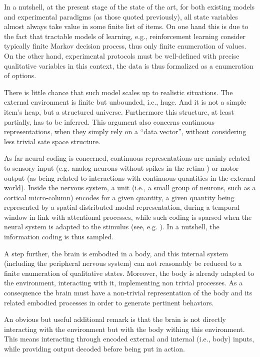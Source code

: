 \documentclass[a4,12pt,twoside]{article}
\begin{document}
In a nutshell, at the present stage of the state of the art, for both existing models and experimental paradigms (as those quoted previously), all state variables almost always take value in some finite list of items. On one hand this is due to the fact that tractable models of learning, e.g., reinforcement learning \cite{sutton1998reinforcement} consider typically finite Markov decision process, thus only finite enumeration of values. On the other hand, experimental protocols must be well-defined with precise qualitative variables in this context, the data is thus formalized as a enumeration of options. 

There is little chance that such model scales up to realistic situations. The external environment is finite but unbounded, i.e., huge. And it is not a simple item’s heap, but a structured universe. Furthermore this structure, at least partially,  has to be inferred. This argument also concerns continuous representations, when they simply rely on a ``data vector'', without considering less trivial sate space structure.

As far neural coding is concerned, continuous representations are mainly related to sensory input (e.g. analog neurons without spikes in the retina \cite{citeulike:7955297}) or motor output (as being related to interactions with continuous quantities in the external world). Inside the nervous system, a unit (i.e., a small group of neurons, such as a cortical micro-column) encodes for a given quantity, a given quantity being represented by a spatial distributed modal representation, during a temporal window in link with attentional processes, while such coding is sparsed when the neural system is adapted to the stimulus (see, e.g. \cite{citeulike:4194318}). In a nutshell, the information coding is thus sampled.

A step further, the brain is embodied in a body, and this internal system (including the peripheral nervous system) can not reasonably be reduced to a finite enumeration of qualitative states. Moreover, the body is already adapted to the environment, interacting with it, implementing non trivial processes. As a consequence the brain must have a non-trivial representation of the body and its related embodied processes in order to generate pertinent behaviors.

An obvious but useful additional remark is that the brain is not directly interacting with the environment but with the body withing this environment. This means interacting through encoded external and internal (i.e., body) inputs, while providing output decoded before being put in action. 
\end{document}
